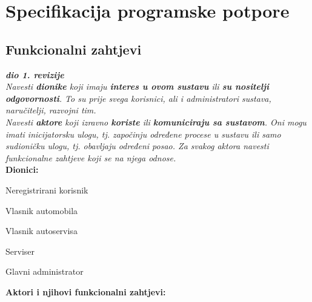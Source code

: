 \chapter{Specifikacija programske potpore}
		
	\section{Funkcionalni zahtjevi}
			
			\textbf{\textit{dio 1. revizije}}\\
			
			\textit{Navesti \textbf{dionike} koji imaju \textbf{interes u ovom sustavu} ili  \textbf{su nositelji odgovornosti}. To su prije svega korisnici, ali i administratori sustava, naručitelji, razvojni tim.}\\
				
			\textit{Navesti \textbf{aktore} koji izravno \textbf{koriste} ili \textbf{komuniciraju sa sustavom}. Oni mogu imati inicijatorsku ulogu, tj. započinju određene procese u sustavu ili samo sudioničku ulogu, tj. obavljaju određeni posao. Za svakog aktora navesti funkcionalne zahtjeve koji se na njega odnose.}\\
			
			
			\noindent \textbf{Dionici:}
			
			\begin{packed_enum}
				
				\item Neregistrirani korisnik
				\item Vlasnik automobila			
				\item Vlasnik autoservisa
				\item Serviser
				\item Glavni administrator
				
			\end{packed_enum}
			
			\noindent \textbf{Aktori i njihovi funkcionalni zahtjevi:}
			
